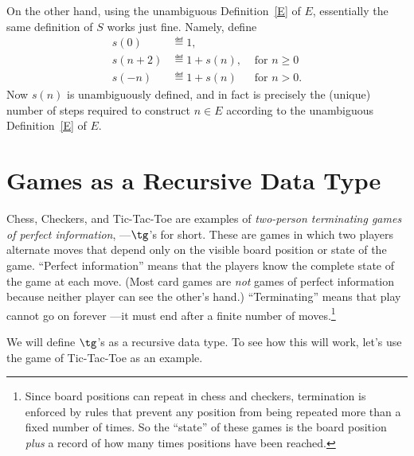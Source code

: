 \begin{definition}
On the other hand, using the unambiguous Definition~\ref{E} of $E$,
essentially the same definition of $S$ works just fine.  Namely, define
\begin{align*}
  s(0) & \eqdef 1,\\
  s(n+2) & \eqdef 1+ s(n), & \text{ for } n \geq 0\\
  s(-n) & \eqdef 1+ s(n) & \text{ for } n > 0.
\end{align*}
Now $s(n)$ is unambiguously defined, and in fact is precisely the (unique)
number of steps required to construct $n \in E$ according to the
unambiguous Definition~\ref{E} of $E$.
\fi


\begin{problems}
\classproblems
{}

\homeworkproblems
{}

\end{problems}

\section{Games as a Recursive Data Type}

Chess, Checkers, and Tic-Tac-Toe are examples of \emph{two-person
terminating games of perfect information}, ---$\tg$'s for short.  These
are games in which two players alternate moves that depend only on the
visible board position or state of the game.  ``Perfect information''
means that the players know the complete state of the game at each move.
(Most card games are \emph{not} games of perfect information because
neither player can see the other's hand.)  ``Terminating'' means that play
cannot go on forever ---it must end after a finite number of
moves.\footnote{Since board positions can repeat in chess and checkers,
termination is enforced by rules that prevent any position from being
repeated more than a fixed number of times.  So the ``state'' of these
games is the board position \emph{plus} a record of how many times
positions have been reached.}

We will define $\tg$'s as a 
recursive data type.  To see how this will work, let's use the game of
Tic-Tac-Toe as an example.


\end{definition}

